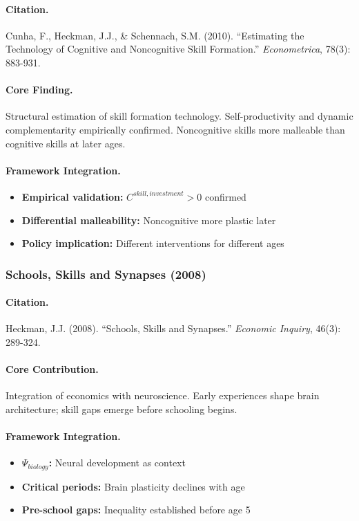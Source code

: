 \paragraph{Citation.}
Cunha, F., Heckman, J.J., \& Schennach, S.M. (2010). ``Estimating the
Technology of Cognitive and Noncognitive Skill Formation.''
\emph{Econometrica}, 78(3): 883-931.

\paragraph{Core Finding.}
Structural estimation of skill formation technology. Self-productivity
and dynamic complementarity empirically confirmed. Noncognitive skills
more malleable than cognitive skills at later ages.

\paragraph{Framework Integration.}
\begin{itemize}
  \item \textbf{Empirical validation:} $C^{skill,investment} > 0$ confirmed
  \item \textbf{Differential malleability:} Noncognitive more plastic later
  \item \textbf{Policy implication:} Different interventions for different ages
\end{itemize}

\subsubsection{Schools, Skills and Synapses (2008)}

\paragraph{Citation.}
Heckman, J.J. (2008). ``Schools, Skills and Synapses.''
\emph{Economic Inquiry}, 46(3): 289-324.

\paragraph{Core Contribution.}
Integration of economics with neuroscience. Early experiences shape
brain architecture; skill gaps emerge before schooling begins.

\paragraph{Framework Integration.}
\begin{itemize}
  \item \textbf{$\Psi_{biology}$:} Neural development as context
  \item \textbf{Critical periods:} Brain plasticity declines with age
  \item \textbf{Pre-school gaps:} Inequality established before age 5
\end{itemize}

